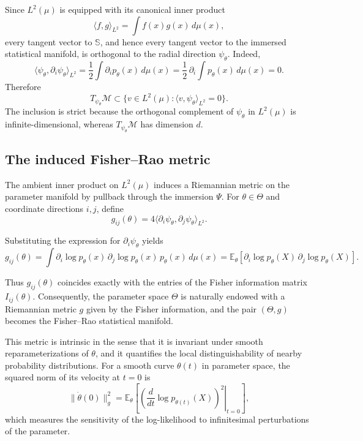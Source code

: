 \documentclass[11pt,letterpaper]{amsart}
\numberwithin{equation}{section}
\theoremstyle{plain}
\theoremstyle{definition}
\theoremstyle{remark}
\begin{document}
Since \(L^2(\mu)\) is equipped with its canonical inner product
\begin{equation*}
\langle f,g\rangle_{L^2}
=
\int f(x)g(x)\,d\mu(x),
\end{equation*}
every tangent vector to \(\mathbb S\), and hence every tangent vector to the immersed statistical manifold, is orthogonal to the radial direction \(\psi_\theta\). Indeed,
\begin{equation*}
\langle \psi_\theta,\partial_i\psi_\theta\rangle_{L^2}
=
\frac12\int \partial_i p_\theta(x)\,d\mu(x)
=
\frac12\,\partial_i\int p_\theta(x)\,d\mu(x)
=
0.
\end{equation*}
Therefore
\begin{equation*}
T_{\psi_\theta}\mathcal M
\subset
\{v\in L^2(\mu):\langle v,\psi_\theta\rangle_{L^2}=0\}.
\end{equation*}
The inclusion is strict because the orthogonal complement of \(\psi_\theta\) in \(L^2(\mu)\) is infinite-dimensional, whereas \(T_{\psi_\theta}\mathcal M\) has dimension \(d\).

\subsection{The induced Fisher--Rao metric}

The ambient inner product on \(L^2(\mu)\) induces a Riemannian metric on the parameter manifold by pullback through the immersion \(\Psi\). For \(\theta\in\Theta\) and coordinate directions \(i,j\), define
\begin{equation*}
g_{ij}(\theta)
=
4\langle \partial_i\psi_\theta,\partial_j\psi_\theta\rangle_{L^2}.
\end{equation*}

Substituting the expression for \(\partial_i\psi_\theta\) yields
\begin{equation*}
g_{ij}(\theta)
=
\int
\partial_i\log p_\theta(x)\,
\partial_j\log p_\theta(x)\,
p_\theta(x)\,d\mu(x)
=
\mathbb E_\theta\!\left[
\partial_i\log p_\theta(X)\,
\partial_j\log p_\theta(X)
\right].
\end{equation*}

Thus \(g_{ij}(\theta)\) coincides exactly with the entries of the Fisher information matrix \(I_{ij}(\theta)\). Consequently, the parameter space \(\Theta\) is naturally endowed with a Riemannian metric \(g\) given by the Fisher information, and the pair \((\Theta,g)\) becomes the Fisher--Rao statistical manifold.

This metric is intrinsic in the sense that it is invariant under smooth reparameterizations of \(\theta\), and it quantifies the local distinguishability of nearby probability distributions. For a smooth curve \(\theta(t)\) in parameter space, the squared norm of its velocity at \(t=0\) is
\begin{equation*}
\|\dot\theta(0)\|_g^2
=
\mathbb E_\theta\!\left[
\left.
\left(\frac{d}{dt}\log p_{\theta(t)}(X)\right)^2
\right|_{t=0}
\right],
\end{equation*}
which measures the sensitivity of the log-likelihood to infinitesimal perturbations of the parameter.
\end{document}
